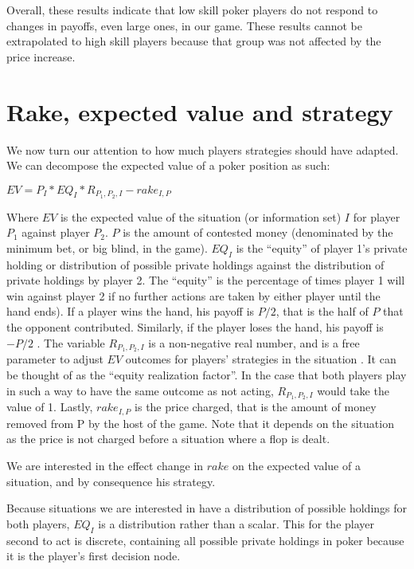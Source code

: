 \documentclass[12pt]{article}
\begin{document}
Overall, these results indicate that low skill poker players do not respond to changes in payoffs, even large ones, in our game. These results cannot be extrapolated to high skill players because that group was not affected by the price increase.

\section{Rake, expected value and strategy} \label{sec:discussion}

We now turn our attention to how much players strategies should have adapted. We can decompose the expected value of a poker position as such:

$EV = P_I * EQ_I * R_{P_1, P_2, I} - rake_{I, P}$

Where $EV$ is the expected value of the situation (or information set) $I$ for player $P_1$ against player $P_2$. $P$ is the amount of contested money (denominated by the minimum bet, or big blind, in the game). $EQ_I$ is the “equity” of player 1’s private holding or distribution of possible private holdings against the distribution of private holdings by player 2. The “equity” is the percentage of times player 1 will win against player 2 if no further actions are taken by either player until the hand ends). If a player wins the hand, his payoff is $P/2$, that is the half of $P$ that the opponent contributed. Similarly, if the player loses the hand, his payoff is $-P/2$ . The variable $R_{P_1, P_2, I}$ is a non-negative real number, and is a free parameter to adjust $EV$ outcomes for players’ strategies in the situation . It can be thought of as the “equity realization factor”. In the case that both players play in such a way to have the same outcome as not acting, $R_{P_1, P_2, I}$ would take the value of 1. Lastly, $rake_{I, P}$ is the price charged, that is the amount of money removed from P by the host of the game. Note that it depends on the situation as the price is not charged before a situation where a flop is dealt.

We are interested in the effect change in $rake$ on the expected value of a situation, and by consequence his strategy. 

Because situations we are interested in have a distribution of possible holdings for both players, $EQ_I$  is a distribution rather than a scalar. This for the player second to act is discrete, containing all   possible private holdings in poker because it is the player’s first decision node.
\end{document}
